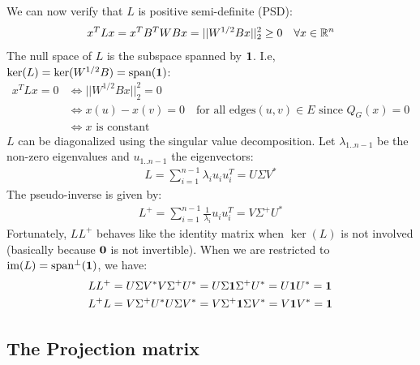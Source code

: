\documentclass{article}
\begin{document}
We can now verify that $L$ is positive semi-definite (PSD):
\begin{align*}
    x^TLx = x^TB^TWBx = ||W^{1/2}Bx||^2_2 \geq 0 \quad \forall{x
    \in \mathbb{R}^n}
\end{align*}
The null space of $L$ is the subspace spanned by $\mathbf{1}$. I.e, $\ker(L) =
\ker(W^{1/2}B) = \text{span}(\mathbf{1})$:
\begin{align*}
    x^TLx = 0 &\Leftrightarrow ||W^{1/2}Bx||^2_2 = 0 \\
                &\Leftrightarrow x(u) - x(v) = 0 \quad \text{for all edges}
(u, v) \in E \text{ since } Q_G(x) = 0 \\
    &\Leftrightarrow x \text{ is constant}
\end{align*}
$L$ can be diagonalized using the singular value decomposition. Let
$\lambda_{1..n-1}$ be the non-zero eigenvalues and $u_{1..n-1}$ the
eigenvectors:
\begin{align*}
    L = \sum_{i=1}^{n-1} \lambda_iu_iu^T_i = U\Sigma V^*
\end{align*}
The pseudo-inverse is given by:
\begin{align*}
    L^+ = \sum_{i=1}^{n-1} \frac{1}{\lambda_i}u_iu^T_i = V\Sigma^+ U^*
\end{align*}
Fortunately, $LL^+$ behaves like the identity matrix when $\ker(L)$ is
not involved (basically because $\mathbf{0}$ is not invertible). When we are
restricted to $\text{im}(L) = \text{span}^{\bot}(\mathbf{1})$, we have:
\begin{align*}
    LL^+ &= U\Sigma V^*V\Sigma^+ U^*
             = U\Sigma \mathbf{1} \Sigma^+ U^*
             = U \mathbf{1} U^*
             = \mathbf{1} \\
    L^+L &= V\Sigma^+ U^*U\Sigma V^*
             = V\Sigma^+ \mathbf{1} \Sigma V^*
             = V\mathbf{1} V^*
             = \mathbf{1}
\end{align*}

\subsection{The Projection matrix}
\end{document}
